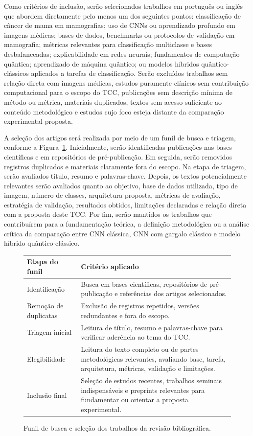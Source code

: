 \documentclass[
    12pt,
    openright,
    oneside,
    a4paper,
    english,
    brazil
]{abntex2}
\begin{document}
Como critérios de inclusão, serão selecionados trabalhos em português ou inglês que abordem diretamente pelo menos um dos seguintes pontos: classificação de câncer de mama em mamografias; uso de CNNs ou aprendizado profundo em imagens médicas; bases de dados, benchmarks ou protocolos de validação em mamografia; métricas relevantes para classificação multiclasse e bases desbalanceadas; explicabilidade em redes neurais; fundamentos de computação quântica; aprendizado de máquina quântico; ou modelos híbridos quântico-clássicos aplicados a tarefas de classificação. Serão excluídos trabalhos sem relação direta com imagens médicas, estudos puramente clínicos sem contribuição computacional para o escopo do TCC, publicações sem descrição mínima de método ou métrica, materiais duplicados, textos sem acesso suficiente ao conteúdo metodológico e estudos cujo foco esteja distante da comparação experimental proposta.

A seleção dos artigos será realizada por meio de um funil de busca e triagem, conforme a Figura~\ref{fig:funil_busca_bibliografica}. Inicialmente, serão identificadas publicações nas bases científicas e em repositórios de pré-publicação. Em seguida, serão removidos registros duplicados e materiais claramente fora do escopo. Na etapa de triagem, serão avaliados título, resumo e palavras-chave. Depois, os textos potencialmente relevantes serão avaliados quanto ao objetivo, base de dados utilizada, tipo de imagem, número de classes, arquitetura proposta, métricas de avaliação, estratégia de validação, resultados obtidos, limitações declaradas e relação direta com a proposta deste TCC. Por fim, serão mantidos os trabalhos que contribuírem para a fundamentação teórica, a definição metodológica ou a análise crítica da comparação entre CNN clássica, CNN com gargalo clássico e modelo híbrido quântico-clássico.

\begin{figure}[H]
    \centering
    \begin{tabular}{p{}p{}}
        \toprule
        \textbf{Etapa do funil} & \textbf{Critério aplicado} \\
        \midrule
        Identificação & Busca em bases científicas, repositórios de pré-publicação e referências dos artigos selecionados. \\
        Remoção de duplicatas & Exclusão de registros repetidos, versões redundantes e fora do escopo. \\
        Triagem inicial & Leitura de título, resumo e palavras-chave para verificar aderência ao tema do TCC. \\
        Elegibilidade & Leitura do texto completo ou de partes metodológicas relevantes, avaliando base, tarefa, arquitetura, métricas, validação e limitações. \\
        Inclusão final & Seleção de estudos recentes, trabalhos seminais indispensáveis e preprints relevantes para fundamentar ou orientar a proposta experimental. \\
        \bottomrule
    \end{tabular}
    \caption{Funil de busca e seleção dos trabalhos da revisão bibliográfica.}
    \label{fig:funil_busca_bibliografica}
\end{figure}
\end{document}
